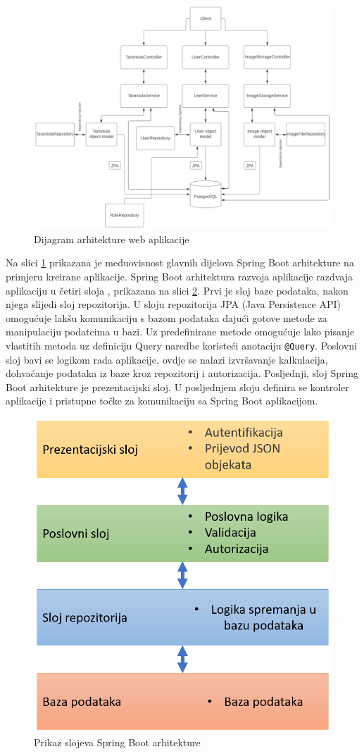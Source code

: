 \documentclass[a4paper,12pt,oneside]{article}
\begin{document}
\begin{figure}
    \centering
    \includegraphics[width=1\linewidth]{Slike/AppArchitecture.png}
    \caption{Dijagram arhitekture web aplikacije}
    \label{fig:app-architecture}
\end{figure}

Na slici \ref{fig:app-architecture} prikazana je međuovisnost glavnih dijelova Spring Boot arhitekture na primjeru kreirane aplikacije. Spring Boot arhitektura razvoja aplikacije razdvaja aplikaciju u četiri sloja , prikazana na slici \ref{fig:dijagram-arch-apk}. Prvi je sloj baze podataka, nakon njega slijedi sloj repozitorija. U sloju repozitorija JPA (Java Persistence API) omogućuje lakšu komunikaciju s bazom podataka dajući gotove metode za manipulaciju podatcima u bazi. Uz predefinirane metode omogućuje lako pisanje vlastitih metoda uz definiciju Query naredbe koristeći anotaciju \texttt{@Query}. Poslovni sloj bavi se logikom rada aplikacije, ovdje se nalazi izvršavanje kalkulacija, dohvaćanje podataka iz baze kroz repozitorij i autorizacija. Posljednji, sloj Spring Boot arhitekture je prezentacijski sloj. U posljednjem sloju definira se kontroler aplikacije i pristupne točke za komunikaciju sa Spring Boot aplikacijom.



\begin{figure}
    \centering
    \includegraphics[width=0.5\linewidth]{Slike/springMvcLogic.png}
    \caption{Prikaz slojeva Spring Boot arhitekture \cite{springArchitectureLayers}}
    \label{fig:dijagram-arch-apk}
\end{figure}
\end{document}
